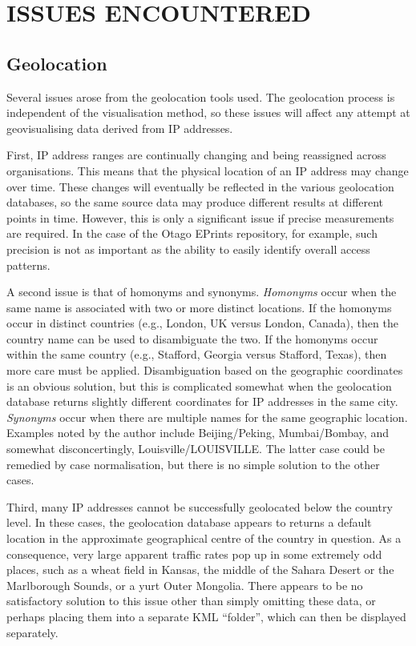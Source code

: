 \documentclass[10pt]{article}
\begin{document}
\section{ISSUES ENCOUNTERED}
\label{sec-issues}


\subsection{Geolocation}

Several issues arose from the geolocation tools used. The geolocation process is independent of the visualisation method, so these issues will affect any attempt at geovisualising data derived from IP addresses.

First, IP address ranges are continually changing and being reassigned across organisations. This means that the physical location of an IP address may change over time. These changes will eventually be reflected in the various geolocation databases, so the same source data may produce different results at different points in time. However, this is only a significant issue if precise measurements are required. In the case of the Otago EPrints repository, for example, such precision is not as important as the ability to easily identify overall access patterns.

A second issue is that of homonyms and synonyms. \emph{Homonyms} occur when the same name is associated with two or more distinct locations. If the homonyms occur in distinct countries (e.g., London, UK versus London, Canada), then the country name can be used to disambiguate the two. If the homonyms occur within the same country (e.g., Stafford, Georgia versus Stafford, Texas), then more care must be applied. Disambiguation based on the geographic coordinates is an obvious solution, but this is complicated somewhat when the geolocation database returns slightly different coordinates for IP addresses in the same city. \emph{Synonyms} occur when there are multiple names for the same geographic location. Examples noted by the author include Beijing/Peking, Mumbai/Bombay, and somewhat disconcertingly, Louisville/LOUISVILLE. The latter case could be remedied by case normalisation, but there is no simple solution to the other cases.

Third, many IP addresses cannot be successfully geolocated below the country level. In these cases, the geolocation database appears to returns a default location in the approximate geographical centre of the country in question. As a consequence, very large apparent traffic rates pop up in some extremely odd places, such as a wheat field in Kansas, the middle of the Sahara Desert or the Marlborough Sounds, or a yurt Outer Mongolia. There appears to be no satisfactory solution to this issue other than simply omitting these data, or perhaps placing them into a separate KML ``folder'', which can then be displayed separately.
\end{document}
